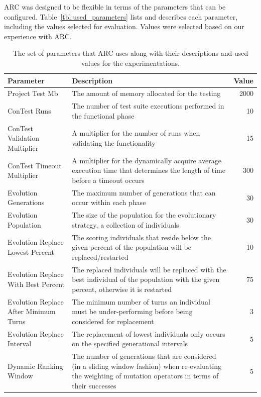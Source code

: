 \documentclass{llncs}
\begin{document}
ARC was designed to be flexible in terms of the parameters that can be
configured. Table~\ref{tbl:used_parameters} lists and describes each parameter,
including the values selected for evaluation. Values were selected based on our
experience with ARC.


\begin{table}[h]
\caption{The set of parameters that ARC uses along with their descriptions and
used values for the experimentations.}
\begin{center}
\begin{tabular}{|p{3cm}|p{10cm}|r|}
\hline
\textbf{Parameter} & \textbf{Description} & \textbf{Value}\\
\hline
Project Test Mb & The amount of memory allocated for the testing & 2000\\
\hline
ConTest Runs & The number of test suite executions performed in the functional phase & 10\\
\hline
ConTest Validation Multiplier & A multiplier for the number of runs when validating the functionality & 15\\
\hline
ConTest Timeout Multiplier & A multiplier for the dynamically acquire average execution time that determines the length of time before a timeout occurs & 300\\
\hline
Evolution Generations & The maximum number of generations that can occur within each phase & 30\\
\hline
Evolution Population & The size of the population for the evolutionary strategy, a collection of individuals & 30\\
\hline
Evolution Replace Lowest Percent & The scoring individuals that reside below the given percent of the population will be replaced/restarted & 10\\
\hline
Evolution Replace With Best Percent & The replaced individuals will be replaced with the best individual of the population with the given percent, otherwise it is restarted & 75\\
\hline
Evolution Replace After Minimum Turns & The minimum number of turns an individual must be under-performing before being considered for replacement & 3\\
\hline
Evolution Replace Interval & The replacement of lowest individuals only occurs on the specified generational intervals & 5\\
\hline
Dynamic Ranking Window & The number of generations that are considered (in a sliding window fashion) when re-evaluating the weighting of mutation operators in terms of their successes & 5\\

\end{tabular}
\end{center}
\end{table}
\end{document}
